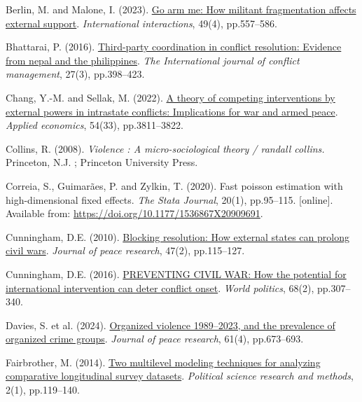 \documentclass[
]{article}
\newlength{\cslhangindent}
\newenvironment{CSLReferences}[2] %
 {\begin{list}{}{%
  \setlength{\itemindent}{0pt}
  \setlength{\leftmargin}{0pt}
  \setlength{\parsep}{0pt}
  \ifodd #1
   \setlength{\leftmargin}{\cslhangindent}
   \setlength{\itemindent}{-1\cslhangindent}
  \fi
  \setlength{\itemsep}{#2\baselineskip}}}
 {\end{list}}
\begin{document}
\begin{CSLReferences}{0}{1}
Berlin, M. and Malone, I. (2023).
\href{https://doi.org/10.1080/03050629.2023.2201881}{Go arm me: How
militant fragmentation affects external support}. \emph{International
interactions}, 49(4), pp.557--586.

Bhattarai, P. (2016).
\href{https://doi.org/10.1108/IJCMA-08-2014-0066}{Third-party
coordination in conflict resolution: Evidence from nepal and the
philippines}. \emph{The International journal of conflict management},
27(3), pp.398--423.

Chang, Y.-M. and Sellak, M. (2022).
\href{https://doi.org/10.1080/00036846.2021.2016588}{A theory of
competing interventions by external powers in intrastate conflicts:
Implications for war and armed peace}. \emph{Applied economics}, 54(33),
pp.3811--3822.

Collins, R. (2008). \emph{Violence : A micro-sociological theory /
randall collins.} Princeton, N.J. ; Princeton University Press.

Correia, S., Guimarães, P. and Zylkin, T. (2020). Fast poisson
estimation with high-dimensional fixed effects. \emph{The Stata
Journal}, 20(1), pp.95--115. {[}online{]}. Available from:
\url{https://doi.org/10.1177/1536867X20909691}.

Cunningham, D.E. (2010).
\href{https://doi.org/10.1177/0022343309353488}{Blocking resolution: How
external states can prolong civil wars}. \emph{Journal of peace
research}, 47(2), pp.115--127.

Cunningham, D.E. (2016).
\href{https://doi.org/10.1017/S0043887115000404}{PREVENTING CIVIL WAR:
How the potential for international intervention can deter conflict
onset}. \emph{World politics}, 68(2), pp.307--340.

Davies, S. et al. (2024).
\href{https://doi.org/10.1177/00223433241262912}{Organized violence
1989--2023, and the prevalence of organized crime groups}. \emph{Journal
of peace research}, 61(4), pp.673--693.

Fairbrother, M. (2014). \href{https://doi.org/10.1017/psrm.2013.24}{Two
multilevel modeling techniques for analyzing comparative longitudinal
survey datasets}. \emph{Political science research and methods}, 2(1),
pp.119--140.


\end{CSLReferences}
\end{document}

